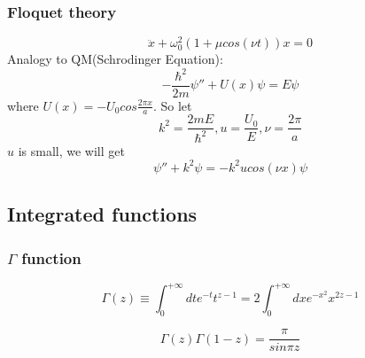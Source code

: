 \subsubsection{Floquet theory}
\begin{equation}
    \ddot{x} + \omega_{0}^{2}(1+\mu cos(\nu t))x = 0
\end{equation}
Analogy to QM(Schrodinger Equation):	\\
$$-\frac{\hbar^{2}}{2m}{\psi''} + U(x)\psi = E\psi$$ 
where $U(x) = -U_{0}cos\frac{2\pi x}{a}$.
So let 
$$k^{2} = \frac{2mE}{\hbar^{2}}, u=\frac{U_0}{E}, \nu=\frac{2\pi}{a}$$ 
$u$ is small, we will get   
$$ \psi''+k^{2}\psi = -k^{2}ucos(\nu x)\psi$$

\subsection{Integrated functions}
\subsubsection{$\Gamma$ function}
$$\Gamma(z) \equiv \int_{0}^{+\infty}dt e^{-t} t^{z-1} =
2\int_{0}^{+\infty}dx e^{-x^2}x^{2z-1}$$

$$\Gamma(z)\Gamma(1-z) = \frac{\pi}{sin\pi z}$$

